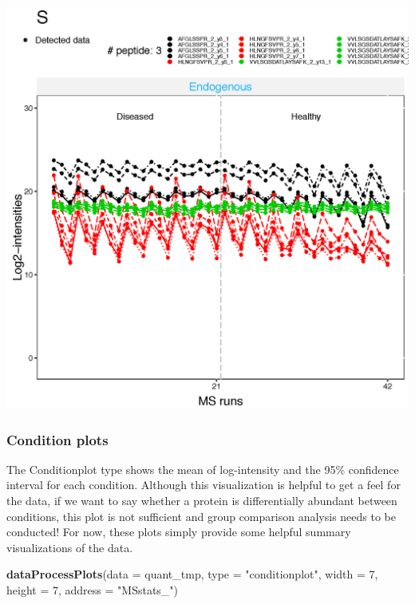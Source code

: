 \documentclass[]{book}
\newenvironment{Shaded}{\begin{snugshade}}{\end{snugshade}}
\newcommand{\DataTypeTok}[1]{\textcolor[rgb]{0.13,0.29,0.53}{#1}}
\newcommand{\DecValTok}[1]{\textcolor[rgb]{0.00,0.00,0.81}{#1}}
\newcommand{\KeywordTok}[1]{\textcolor[rgb]{0.13,0.29,0.53}{\textbf{#1}}}
\newcommand{\NormalTok}[1]{#1}
\newcommand{\StringTok}[1]{\textcolor[rgb]{0.31,0.60,0.02}{#1}}
\begin{document}
\includegraphics{img/MSstats_nonorm_ProfilePlot_S.png}

\hypertarget{condition-plots}{%
\subsubsection{Condition plots}\label{condition-plots}}

The Conditionplot type shows the mean of log-intensity and the 95\% confidence interval for each condition. Although this visualization is helpful to get a feel for the data, if we want to say whether a protein is differentially abundant between conditions, this plot is not sufficient and group comparison analysis needs to be conducted! For now, these plots simply provide some helpful summary visualizations of the data.

\begin{Shaded}
\begin{Highlighting}[]
\KeywordTok{dataProcessPlots}\NormalTok{(}\DataTypeTok{data =}\NormalTok{ quant_tmp, }\DataTypeTok{type =} \StringTok{"conditionplot"}\NormalTok{, }
                 \DataTypeTok{width =} \DecValTok{7}\NormalTok{, }\DataTypeTok{height =} \DecValTok{7}\NormalTok{,}
                 \DataTypeTok{address =} \StringTok{"MSstats_"}\NormalTok{)}
\end{Highlighting}
\end{Shaded}
\end{document}
